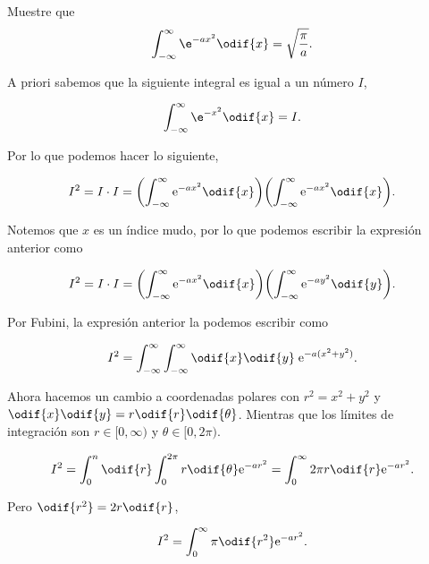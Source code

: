 \documentclass[../main.tex]{subfiles}
\begin{document}
\begin{problema}[10]
	Muestre que
	\begin{equation*}
		\int_{-\infty}^{\infty} \e^{-ax^{2}} \odif{x} = \sqrt{\dfrac{\pi}{a}}.
	\end{equation*}

	\startsolution

	A priori sabemos que la siguiente integral es igual a un número \(I\),

	\begin{equation*}
		\int_{-\infty}^{\infty} \e^{-x^{2}} \odif{x} = I.
	\end{equation*}

	Por lo que podemos hacer lo siguiente,

	\begin{equation*}
		I^{2} = I \cdot I = \biggl(\int_{-\infty}^{\infty} \mathrm{e}^{-ax^{2}}\odif{x}\biggr)\biggl(\int_{-\infty}^{\infty} \mathrm{e}^{-ax^{2}}\odif{x}\biggr).
	\end{equation*}

	Notemos que \(x\) es un índice mudo, por lo que podemos escribir
	la expresión anterior como

	\begin{equation*}
		I^{2} = I \cdot I = \biggl(\int_{-\infty}^{\infty} \mathrm{e}^{-ax^{2}}\odif{x}\biggr)\biggl(\int_{-\infty}^{\infty} \mathrm{e}^{-ay^{2}}\odif{y}\biggr).
	\end{equation*}

	Por Fubini, la expresión anterior la podemos escribir como

	\begin{equation*}
		I^{2} = \int_{-\infty}^{\infty}\int_{-\infty}^{\infty}\odif{x}\odif{y}\;\mathrm{e}^{-a(x^{2} + y^{2})}.
	\end{equation*}

	Ahora hacemos un cambio a coordenadas polares con \(r^{2} = x^{2} + y^{2}\) y \(\odif{x}\odif{y} = r \odif{r}\odif{\theta}\). Mientras que los límites de integración
	son \(r\in[0, \infty)\) y \(\theta \in [0, 2\pi)\).

	\begin{equation*}
		I^{2} = \int_{0}^{n}\odif{r}\int_{0}^{2\pi}r \odif{\theta} \mathrm{e}^{-ar^{2}} =
		\int_{0}^{\infty}2\pi r \odif{r} \mathrm{e}^{-ar^{2}}.
	\end{equation*}

	Pero \(\odif{r^{2}} = 2r \odif{r}\),

	\begin{equation*}
		I^{2} = \int_{0}^{\infty}\pi \odif{r^{2}}\mathrm{e}^{-ar^{2}}.
	\end{equation*}


\end{problema}
\end{document}
